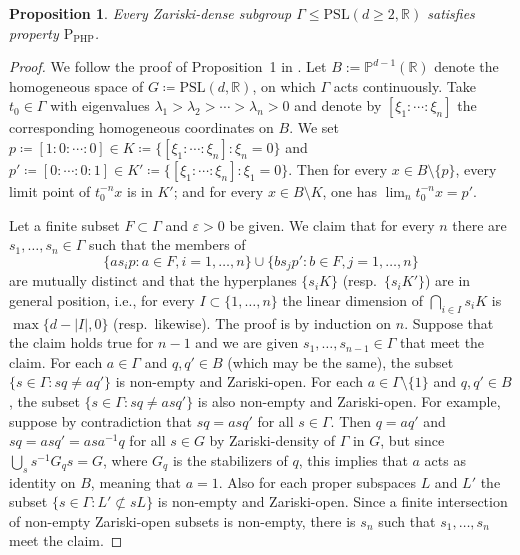 \documentclass[12pt,nosumlimits,nonamelimits]{amsart}
\newtheorem{prop}[thm]{Proposition}
\theoremstyle{remark}
\theoremstyle{definition}
\newcommand{\IP}{\mathbb{P}}
\newcommand{\IR}{\mathbb{R}}
\newcommand{\ve}{\varepsilon}
\newcommand{\Ga}{\Gamma}
\begin{document}
\begin{prop}
Every Zariski-dense subgroup $\Ga\le\mathrm{PSL}(d\geq2,\IR)$ 
satisfies property $\mathrm{P}_{\mathrm{PHP}}$.
\end{prop}
\begin{proof}
We follow the proof of Proposition~1 in \cite{bch}. 
Let $B:=\IP^{d-1}(\IR)$ denote the homogeneous space of 
$G \coloneq \mathrm{PSL}(d,\IR)$, 
on which $\Ga$ acts continuously. 
Take $t_0\in\Ga$ with eigenvalues 
$\lambda_1>\lambda_2 > \cdots >\lambda_n>0$ and 
denote by $[\xi_1 : \cdots : \xi_n]$ the corresponding 
homogeneous coordinates on $B$. 
We set $p \coloneq [1 : 0 : \cdots : 0] \in K\coloneq\{ [\xi_1 : \cdots : \xi_n] : \xi_n = 0\}$ and $p' \coloneq [0 : \cdots : 0 : 1] \in K'\coloneq\{ [\xi_1 : \cdots : \xi_n] : \xi_1 = 0\}$.
Then for every $x\in B\setminus\{p\}$, 
every limit point of $t_0^{-n} x$ is in $K'$; 
and for every $x\in B\setminus K$, 
one has $\lim_n t_0^{-n}x = p'$. 

Let a finite subset $F\subset\Ga$ and $\ve>0$ be given. 
We claim that for every $n$ 
there are $s_1,\ldots,s_n\in\Ga$ such that 
the members of 
\[
\{ a s_i p : a \in F, i=1,\ldots,n \}\cup \{ b s_j p' : b \in F, j=1,\ldots,n \}
\]
are mutually distinct and that the hyperplanes 
$\{ s_i K \}$ (resp.\ $\{ s_i K'\}$) are in general position,
i.e., for every $I\subset\{1,\ldots,n\}$  
the linear dimension of $\bigcap_{i\in I} s_iK$ 
is $\max\{d-|I|,0\}$ (resp.\ likewise).
The proof is by induction on $n$. 
Suppose that the claim holds true for $n-1$ 
and we are given $s_1,\ldots,s_{n-1}\in\Ga$ that meet the claim.
For each $a\in\Ga$ and $q,q'\in B$ (which may be the same), 
the subset 
$\{ s\in\Ga : sq\neq aq'\}$ is non-empty and Zariski-open. 
For each $a\in\Ga\setminus\{1\}$ 
and $q,q'\in B$, the subset 
$\{ s\in\Ga : sq\neq asq'\}$  
is also non-empty and Zariski-open. 
For example, suppose by contradiction 
that $sq=asq'$ for all $s\in\Ga$. 
Then $q=aq'$ and $sq=asq'=asa^{-1}q$ 
for all $s\in G$ 
by Zariski-density of $\Ga$ in $G$, 
but since $\bigcup_s s^{-1}G_q s = G$, 
where $G_q$ is the stabilizers of $q$, 
this implies that $a$ acts as identity on $B$, meaning that $a=1$. 
Also for each proper subspaces $L$ and $L'$ 
the subset $\{ s\in\Ga : L' \not\subset sL\}$ 
is non-empty and Zariski-open. 
Since a finite intersection of 
non-empty Zariski-open subsets is non-empty, 
there is $s_n$ such that $s_1,\ldots,s_n$ meet the claim. 


\end{proof}
\end{document}
